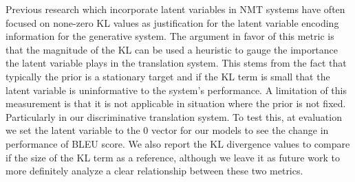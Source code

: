 Previous research which incorporate latent variables in \ac{NMT} systems have often focused on none-zero KL values as justification for the latent variable encoding information for the generative system. The argument in favor of this metric is that the magnitude of the KL can be used a heuristic to gauge the importance the latent variable plays in the translation system. This stems from the fact that typically the prior is a stationary target and if the KL term is small that the latent variable is uninformative to the system's performance. A limitation of this measurement is that it is not applicable in situation where the prior is not fixed. Particularly in our discriminative translation system.
 To test this, at evaluation we set the latent variable to the 0 vector for our models to see the change in performance of BLEU score. We also report the KL divergence values to compare if the size of the KL term as a reference, although we leave it as future work to more definitely analyze a clear relationship between these two metrics. 
 
